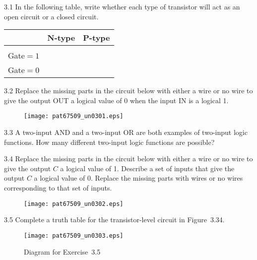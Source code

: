 \documentclass{patt}
\begin{document}
\begin{exercises}
\item[3.1] In the following table, write whether each type of transistor
  will act as an open circuit or a closed circuit.

\begin{inlinetable}
\begin{tabular}{@{}lcc@{}}
\hline
\rule{0pt}{10pt} & N-type & P-type \\\hline\\[-7pt]
Gate${}=1$\\[3pt]
Gate${}=0$ \\
\hline
\end{tabular}
\end{inlinetable}

\item[3.2] Replace the missing parts in the circuit below with either
  a wire or no wire to give the output OUT a logical value of 0 when
  the input IN is a logical 1.

  \begin{figure}[h]
  \centerline{\texttt{[image: pat67509\_un0301.eps]}}
  \end{figure}

\item[3.3] A two-input AND and a two-input OR are both examples of
  two-input logic functions. How many different two-input logic
  functions are possible?

\newpage

\item[3.4] Replace the missing parts in the circuit below with either
  a wire or no wire to give the output $C$ a logical value of 1.
  Describe a set of inputs that give the output $C$ a logical value of
  0.  Replace the missing parts with wires or no wires corresponding
  to that set of inputs.

\bigskip
\bigskip

  \begin{figure}[h]
  \centerline{\texttt{[image: pat67509\_un0302.eps]}}
  \end{figure}


\item[3.5] Complete a truth table for the transistor-level circuit in
  Figure~3.34.

\bigskip
\bigskip

\begin{figure}[h]
\centerline{\texttt{[image: pat67509\_un0303.eps]}}
\caption{Diagram for Exercise~3.5}
\label{ex_fig:not}
\end{figure}


\end{exercises}
\end{document}
